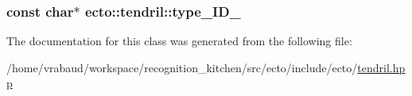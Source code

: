 \subsubsection[{\texorpdfstring{type\+\_\+\+I\+D\+\_\+}{type_ID_}}]{\setlength{\rightskip}{0pt plus 5cm}const char$\ast$ ecto\+::tendril\+::type\+\_\+\+I\+D\+\_\+\hspace{0.3cm}{\ttfamily [private]}}\hypertarget{classecto_1_1tendril_a5b237bfa0a9acefc48d577b77380058d}{}\label{classecto_1_1tendril_a5b237bfa0a9acefc48d577b77380058d}


The documentation for this class was generated from the following file\+:\begin{DoxyCompactItemize}
\item 
/home/vrabaud/workspace/recognition\+\_\+kitchen/src/ecto/include/ecto/\hyperlink{tendril_8hpp}{tendril.\+hpp}\end{DoxyCompactItemize}
